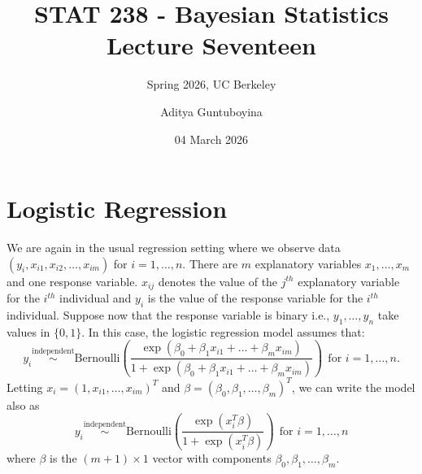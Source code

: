 \documentclass{scrartcl}
\begin{document}
\title{STAT 238 - Bayesian Statistics  \\
  Lecture Seventeen} 
\subtitle{Spring 2026, UC Berkeley}

\author{Aditya Guntuboyina}


\date{04 March 2026}

\maketitle

\section{Logistic Regression}

We are again in the
usual regression setting where we observe  data $(y_i,
x_{i1},x_{i2}, \dots, x_{im})$ for $i = 1, \dots, n$. There are $m$
explanatory variables $x_1, \dots, x_m$ and one response variable.
$x_{ij}$ denotes the value of the $j^{th}$ explanatory variable for
the $i^{th}$ individual and $y_i$ is the value of the response
variable for the $i^{th}$ individual. Suppose now that the response
variable is binary i.e., $y_1, \dots, y_n$ take values in $\{0,
1\}$. In this case, the logistic regression model assumes that: 
  \begin{equation*}
    y_i  \overset{\text{independent}}{\sim} \text{Bernoulli} \left(\frac{\exp
        \left(\beta_0 + \beta_1 x_{i1} + \dots + \beta_m x_{im} \right)}{1 + \exp \left(\beta_0 + \beta_1 x_{i1} + \dots + \beta_m x_{im} \right)} 
    \right) ~~\text{for $i = 1, \dots, n$}. 
  \end{equation*}
Letting $x_i = (1, x_{i1}, \dots, x_{im})^T$  and $\beta = (\beta_0,
\beta_1, \dots, \beta_m)^T$, we can write the model also as
  \begin{equation*}
    y_i  \overset{\text{independent}}{\sim} \text{Bernoulli} \left(\frac{\exp
        \left(x_i^T \beta\right)}{1 + \exp \left(x_i^T \beta \right)} 
    \right) ~~\text{for $i = 1, \dots, n$}
  \end{equation*}
  where $\beta$ is the $(m+1) \times 1$ vector with components
  $\beta_0, \beta_1, \dots, \beta_m$.
\end{document}
